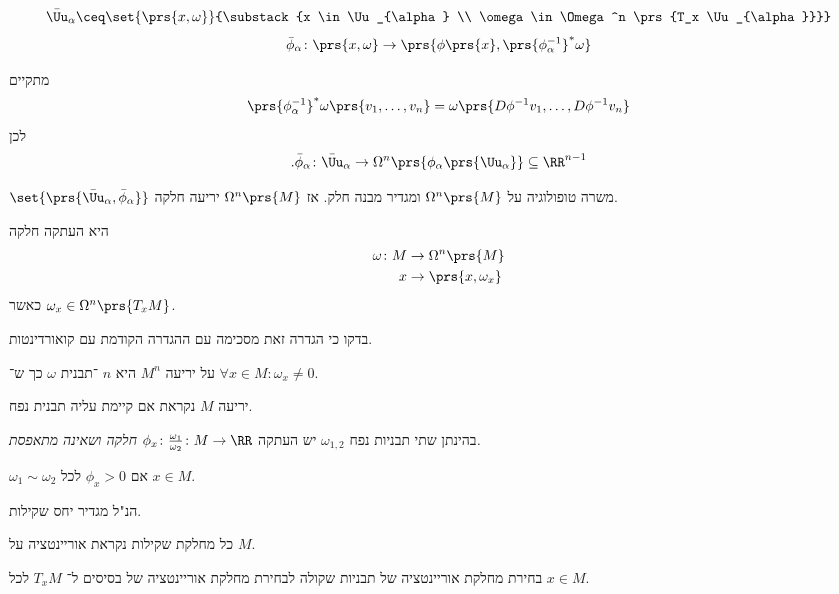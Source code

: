 \documentclass[a4paper,10pt,twoside,openany]{book}
\begin{document}
\begin{definition}
\begin{align*}
\bar{\Uu}_{\alpha} \ceq \set{\prs{x,\omega}}{\substack{x \in \Uu_{\alpha} \\ \omega \in \Omega^n \prs{T_x \Uu_{\alpha}}}}
\end{align*}
\begin{align*}
\bar{\phi}_{\alpha} \colon \prs{x,\omega} \to \prs{\phi\prs{x}, \prs{\phi^{-1}_{\alpha}}^* \omega}
\end{align*}
\end{definition}
\begin{remark}
מתקיים
\[\prs{\phi_{\alpha}^{-1}}^* \omega\prs{v_1, \ldots, v_n} = \omega\prs{D\phi^{-1}v_1, \ldots, D\phi^{-1}v_n}\]
לכן
\[\text{.}\bar{\phi}_{\alpha} \colon \bar{\Uu}_{\alpha} \to \Omega^n \prs{\phi_{\alpha}\prs{\Uu_{\alpha}}} \subseteq \RR^{n-1}\]
\end{remark}
\begin{exercise}
$\set{\prs{\bar{\Uu}_{\alpha}, \bar{\phi}_{\alpha}}}$
משרה טופולוגיה על
$\Omega^n\prs{M}$
ומגדיר מבנה חלק.
אז
$\Omega^n\prs{M}$
יריעה חלקה.
\end{exercise}
\begin{definition}
היא העתקה חלקה
\begin{align*}
\omega \colon M &\to \Omega^n \prs{M} \\
x &\to \prs{x,\omega_x}
\end{align*}
כאשר
$\omega_x \in \Omega^n \prs{T_x M}$.
\end{definition}
\begin{exercise}
בדקו כי הגדרה זאת מסכימה עם ההגדרה הקודמת עם קואורדינטות.
\end{exercise}
\begin{definition}
על יריעה
$M^n$
היא
$n$%
־תבנית
$\omega$
כך ש־%
$\forall x \in M \colon \omega_x \neq 0$.
\end{definition}

\begin{definition}
יריעה
$M$
נקראת
אם קיימת עליה תבנית נפח.
\end{definition}

\begin{exercise}
בהינתן שתי תבניות נפח
$\omega_{1,2}$
יש העתקה
$\phi_x \colon \frac{\omega_1}{\omega_2} \colon M \to \RR$
\emph{חלקה
ושאינה מתאפסת.}
\end{exercise}
\begin{definition}
$\omega_1 \sim \omega_2$
אם
$\phi_x > 0$
לכל
$x \in M$.
\end{definition}
\begin{exercise}
הנ"ל מגדיר יחס שקילות.
\end{exercise}
\begin{definition}
כל מחלקת שקילות נקראת אוריינטציה על
$M$.
\end{definition}
\begin{exercise}
בחירת מחלקת אוריינטציה של תבניות שקולה לבחירת מחלקת אוריינטציה של בסיסים ל־%
$T_x M$
לכל
$x \in M$.
\end{exercise}
\end{document}
